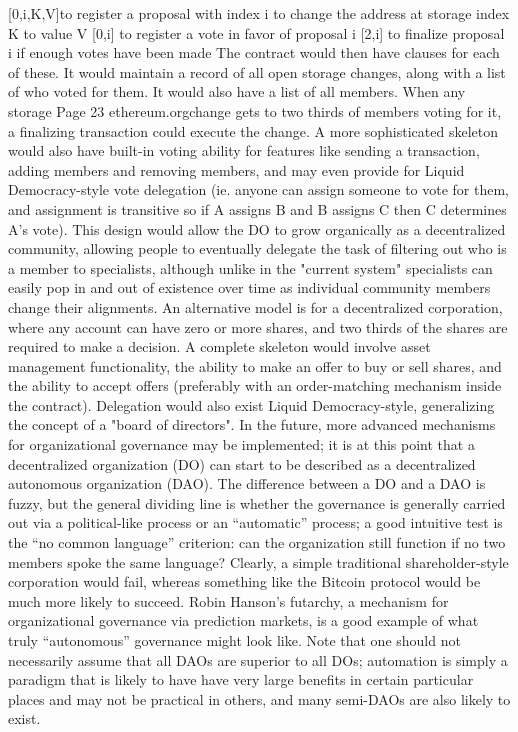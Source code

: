 \documentclass[11pt,a4paper]{article}
\begin{document}
[0,i,K,V]to register a proposal with index i to change the address at storage index K to
value V
 [0,i] to register a vote in favor of proposal i
 [2,i] to finalize proposal i if enough votes have been made
The contract would then have clauses for each of these. It would maintain a record of all open storage
changes, along with a list of who voted for them. It would also have a list of all members. When any storage
Page 23
ethereum.orgchange gets to two thirds of members voting for it, a finalizing transaction could execute the change. A more
sophisticated skeleton would also have built-in voting ability for features like sending a transaction, adding
members and removing members, and may even provide for Liquid Democracy-style vote delegation (ie.
anyone can assign someone to vote for them, and assignment is transitive so if A assigns B and B assigns C
then C determines A's vote). This design would allow the DO to grow organically as a decentralized
community, allowing people to eventually delegate the task of filtering out who is a member to specialists,
although unlike in the "current system" specialists can easily pop in and out of existence over time as
individual community members change their alignments.
An alternative model is for a decentralized corporation, where any account can have zero or more shares, and
two thirds of the shares are required to make a decision. A complete skeleton would involve asset
management functionality, the ability to make an offer to buy or sell shares, and the ability to accept offers
(preferably with an order-matching mechanism inside the contract). Delegation would also exist Liquid
Democracy-style, generalizing the concept of a "board of directors".
In the future, more advanced mechanisms for organizational governance may be implemented; it is at this
point that a decentralized organization (DO) can start to be described as a decentralized autonomous
organization (DAO). The difference between a DO and a DAO is fuzzy, but the general dividing line is whether
the governance is generally carried out via a political-like process or an “automatic” process; a good intuitive
test is the “no common language” criterion: can the organization still function if no two members spoke the
same language? Clearly, a simple traditional shareholder-style corporation would fail, whereas something like
the Bitcoin protocol would be much more likely to succeed. Robin Hanson’s futarchy, a mechanism for
organizational governance via prediction markets, is a good example of what truly “autonomous” governance
might look like. Note that one should not necessarily assume that all DAOs are superior to all DOs; automation
is simply a paradigm that is likely to have have very large benefits in certain particular places and may not be
practical in others, and many semi-DAOs are also likely to exist.
\end{document}
